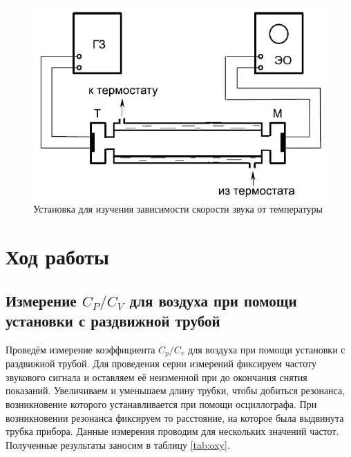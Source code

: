 \documentclass[a4paper,12pt]{article}
\theoremstyle{definition}
\begin{document}
	\begin{figure}[H]
		\begin{center}
			\includegraphics[width=12cm]{ust2.jpg}
		\end{center}
		\caption{Установка для изучения зависимости скорости звука от температуры}
		\label{img2}
	\end{figure}
	
	\section{Ход работы}
	
	\subsection{Измерение $ C_P/C_V $ для воздуха при помощи установки с раздвижной трубой}
	
	\label{ident}
	
	Проведём измерение коэффициента $ C_p/C_v $ для воздуха при помощи установки с раздвижной трубой. Для проведения серии измерений фиксируем частоту звукового сигнала и оставляем её неизменной при до окончания снятия показаний. Увеличиваем и уменьшаем длину трубки, чтобы добиться резонанса, возникновение которого устанавливается при помощи осциллографа. При возникновении резонанса фиксируем то расстояние, на которое была выдвинута трубка прибора. Данные измерения проводим для нескольких значений частот. Полученные результаты заносим в таблицу \ref{tab:oxy}.
	
\end{document}
